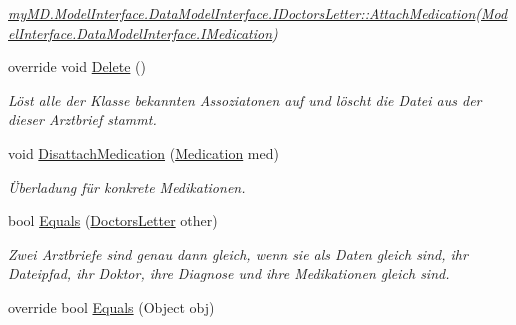 \begin{CompactItemize}
\begin{CompactList}\small\item\em \hyperlink{interfacemy_m_d_1_1_model_interface_1_1_data_model_interface_1_1_i_doctors_letter_d30d4a881bdfd437b1b1da6f3fa7cb38}{my\-MD.Model\-Interface.Data\-Model\-Interface.IDoctors\-Letter::Attach\-Medication}(\hyperlink{interfacemy_m_d_1_1_model_interface_1_1_data_model_interface_1_1_i_medication}{Model\-Interface.Data\-Model\-Interface.IMedication}) \item\end{CompactList}\item 
override void \hyperlink{classmy_m_d_1_1_model_1_1_data_model_1_1_doctors_letter_51a833214dab53bfafb630573fc0fe77}{Delete} ()
\begin{CompactList}\small\item\em L\"{o}st alle der Klasse bekannten Assoziatonen auf und l\"{o}scht die Datei aus der dieser Arztbrief stammt. \item\end{CompactList}\item 
void \hyperlink{classmy_m_d_1_1_model_1_1_data_model_1_1_doctors_letter_054bedc79ee2e214b176609861b0f663}{Disattach\-Medication} (\hyperlink{classmy_m_d_1_1_model_1_1_data_model_1_1_medication}{Medication} med)
\begin{CompactList}\small\item\em \"{U}berladung f\"{u}r konkrete Medikationen. \item\end{CompactList}\item 
bool \hyperlink{classmy_m_d_1_1_model_1_1_data_model_1_1_doctors_letter_727bb18102761937ee7d2d755bf4db6b}{Equals} (\hyperlink{classmy_m_d_1_1_model_1_1_data_model_1_1_doctors_letter}{Doctors\-Letter} other)
\begin{CompactList}\small\item\em Zwei Arztbriefe sind genau dann gleich, wenn sie als Daten gleich sind, ihr Dateipfad, ihr Doktor, ihre Diagnose und ihre Medikationen gleich sind. \item\end{CompactList}\item 
\hypertarget{classmy_m_d_1_1_model_1_1_data_model_1_1_doctors_letter_438d2c1653522e9aff51f785434e952d}{
override bool \hyperlink{classmy_m_d_1_1_model_1_1_data_model_1_1_doctors_letter_438d2c1653522e9aff51f785434e952d}{Equals} (Object obj)}
\label{dc/d86/classmy_m_d_1_1_model_1_1_data_model_1_1_doctors_letter_438d2c1653522e9aff51f785434e952d}


\end{CompactItemize}
